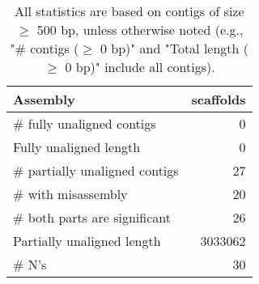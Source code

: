\documentclass[12pt,a4paper]{article}
\begin{document}
\begin{table}[ht]
\begin{center}
\caption{All statistics are based on contigs of size $\geq$ 500 bp, unless otherwise noted (e.g., "\# contigs ($\geq$ 0 bp)" and "Total length ($\geq$ 0 bp)" include all contigs).}
\begin{tabular}{|l*{1}{|r}|}
\hline
Assembly & scaffolds \\ \hline
\# fully unaligned contigs & 0 \\ \hline
Fully unaligned length & 0 \\ \hline
\# partially unaligned contigs & 27 \\ \hline
\hspace{5mm}\# with misassembly & 20 \\ \hline
\hspace{5mm}\# both parts are significant & 26 \\ \hline
Partially unaligned length & 3033062 \\ \hline
\# N's & 30 \\ \hline
\end{tabular}
\end{center}
\end{table}
\end{document}
